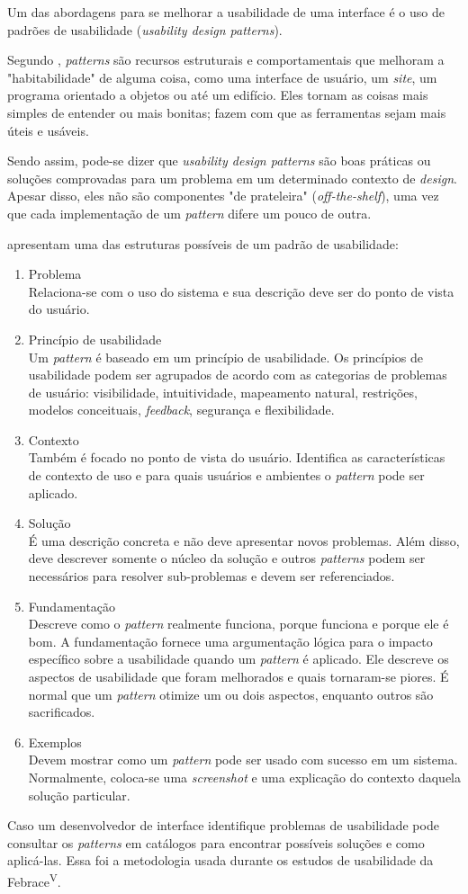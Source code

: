 Um das abordagens para se melhorar a usabilidade de uma interface é o uso de padrões de usabilidade (\textit{usability design patterns}).

Segundo , \textit{patterns} são recursos estruturais e comportamentais que melhoram a "habitabilidade" de alguma coisa, como uma interface de usuário, um \textit{site}, um programa orientado a objetos ou até um edifício. Eles tornam as coisas mais simples de entender ou mais bonitas; fazem com que as ferramentas sejam mais úteis e usáveis.

Sendo assim, pode-se dizer que \textit{usability design patterns} são boas práticas ou soluções comprovadas para um problema em um determinado contexto de \textit{design}. Apesar disso, eles não são componentes "de prateleira" (\textit{off-the-shelf}), uma vez que cada implementação de um \textit{pattern} difere um pouco de outra. 

 apresentam uma das estruturas possíveis de um padrão de usabilidade:
    \begin{enumerate}
        \item Problema \\
            Relaciona-se com o uso do sistema e sua descrição deve ser do ponto de vista do usuário.
        \item Princípio de usabilidade \\
            Um \textit{pattern} é baseado em um princípio de usabilidade. Os princípios de usabilidade podem ser agrupados de acordo com as categorias de problemas de usuário: visibilidade, intuitividade, mapeamento natural, restrições, modelos conceituais, \textit{feedback}, segurança e flexibilidade.
        \item Contexto \\
            Também é focado no ponto de vista do usuário. Identifica as características de contexto de uso e para quais usuários e ambientes o \textit{pattern} pode ser aplicado.
        \item Solução \\
            É uma descrição concreta e não deve apresentar novos problemas. Além disso, deve descrever somente o núcleo da solução e outros \textit{patterns} podem ser necessários para resolver sub-problemas e devem ser referenciados.
        \item Fundamentação \\
            Descreve como o \textit{pattern} realmente funciona, porque funciona e porque ele é bom. A fundamentação fornece uma argumentação lógica para o impacto específico sobre a usabilidade quando um \textit{pattern} é aplicado. Ele descreve os aspectos de usabilidade que foram melhorados e quais tornaram-se piores. É normal que um \textit{pattern} otimize um ou dois aspectos, enquanto outros são sacrificados.
        \item Exemplos \\
            Devem mostrar como um \textit{pattern} pode ser usado com sucesso em um sistema. Normalmente, coloca-se uma \textit{screenshot} e uma explicação do contexto daquela solução particular.
    \end{enumerate}

Caso um desenvolvedor de interface identifique problemas de usabilidade pode consultar os \textit{patterns} em catálogos para encontrar possíveis soluções e como aplicá-las. Essa foi a metodologia usada durante os estudos de usabilidade da Febrace\textsuperscript{V}.
